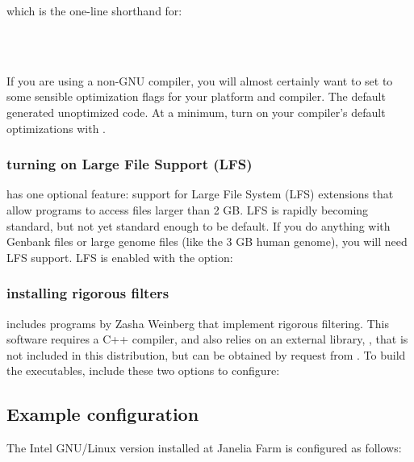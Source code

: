 which is the one-line shorthand for:

\\
\\

If you are using a non-GNU compiler, you will almost certainly want to
set  to some sensible optimization flags for your
platform and compiler. The  default generated unoptimized
code. At a minimum, turn on your compiler's default optimizations with
.

\subsubsection{turning on Large File Support (LFS)}

 has one optional feature: support for Large File
System (LFS) extensions that allow programs to access files larger
than 2 GB. LFS is rapidly becoming standard, but not yet standard
enough to be default. If you do anything with Genbank files or large
genome files (like the 3 GB human genome), you will need LFS support.
LFS is enabled with the  option:


\subsubsection{installing rigorous filters}

 includes programs by Zasha Weinberg that implement
rigorous filtering.  This software requires a C++ compiler, and also
relies on an external library, , that is not included
in this distribution, but can be obtained by request from
.
To build the executables, include these two options to configure:


\subsection{Example configuration}

The Intel GNU/Linux version installed at Janelia Farm is configured as
follows:






